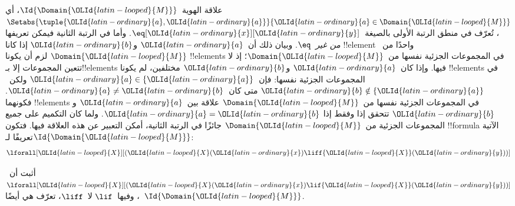 \documentclass[../../../include/open-logic-section]{subfiles}
\begin{document}
\begin{ex}
علاقة الهوية~$\Id{\Domain{{\OLId{latin-looped}{M}}}}$، أي
$\Setabs{\tuple{{\OLId{latin-ordinary}{a}},{\OLId{latin-ordinary}{a}}}}{{\OLId{latin-ordinary}{a}} \in \Domain{{\OLId{latin-looped}{M}}}}$، تُعرّف في منطق
الرتبة الأولى بالصيغة~$\eq[{\OLId{latin-ordinary}{x}}][{\OLId{latin-ordinary}{y}}]$. وأما في الرتبة الثانية فيمكن
تعريفها \emph{من غير~$\eq$}. وبيان ذلك أن~${\OLId{latin-ordinary}{a}}$ و${\OLId{latin-ordinary}{b}}$ إذا كانا
!!{element} واحدًا من~$\Domain{{\OLId{latin-looped}{M}}}$ لزم أن يكونا !!{element}s
في المجموعات الجزئية نفسها من~$\Domain{{\OLId{latin-looped}{M}}}$؛ إذ لا تتعين المجموعات
إلا بـ!!{element}s فيها. وإذا كان~${\OLId{latin-ordinary}{a}}$ و${\OLId{latin-ordinary}{b}}$ مختلفين، لم يكونا
!!{element}s في المجموعات الجزئية نفسها: فإن~${\OLId{latin-ordinary}{a}} \in \{{\OLId{latin-ordinary}{a}}\}$
ولكن~${\OLId{latin-ordinary}{b}} \notin \{{\OLId{latin-ordinary}{a}}\}$ متى كان~${\OLId{latin-ordinary}{a}} \neq {\OLId{latin-ordinary}{b}}$.
فكونهما !!{element}s في المجموعات الجزئية نفسها
من~$\Domain{{\OLId{latin-looped}{M}}}$ علاقة بين~${\OLId{latin-ordinary}{a}}$ و${\OLId{latin-ordinary}{b}}$ تتحقق إذا وفقط إذا
${\OLId{latin-ordinary}{a}} = {\OLId{latin-ordinary}{b}}$. ولما كان التكميم على جميع المجموعات الجزئية
من~$\Domain{{\OLId{latin-looped}{M}}}$ جائزًا في الرتبة الثانية، أمكن التعبير عن هذه
العلاقة فيها. فتكون !!{formula} الآتية تعريفًا
لـ$\Id{\Domain{{\OLId{latin-looped}{M}}}}$:
\[
\lforall[{\OLId{latin-looped}{X}}][({\OLId{latin-looped}{X}}({\OLId{latin-ordinary}{x}}) \liff {\OLId{latin-looped}{X}}({\OLId{latin-ordinary}{y}}))]
\]
\end{ex}

\begin{prob}
أثبت أن~$\lforall[{\OLId{latin-looped}{X}}][({\OLId{latin-looped}{X}}({\OLId{latin-ordinary}{x}}) \lif {\OLId{latin-looped}{X}}({\OLId{latin-ordinary}{y}}))]$، وفيها~$\lif$
لا~$\liff$، تعرّف هي أيضًا~$\Id{\Domain{{\OLId{latin-looped}{M}}}}$.
\end{prob}
\end{document}
